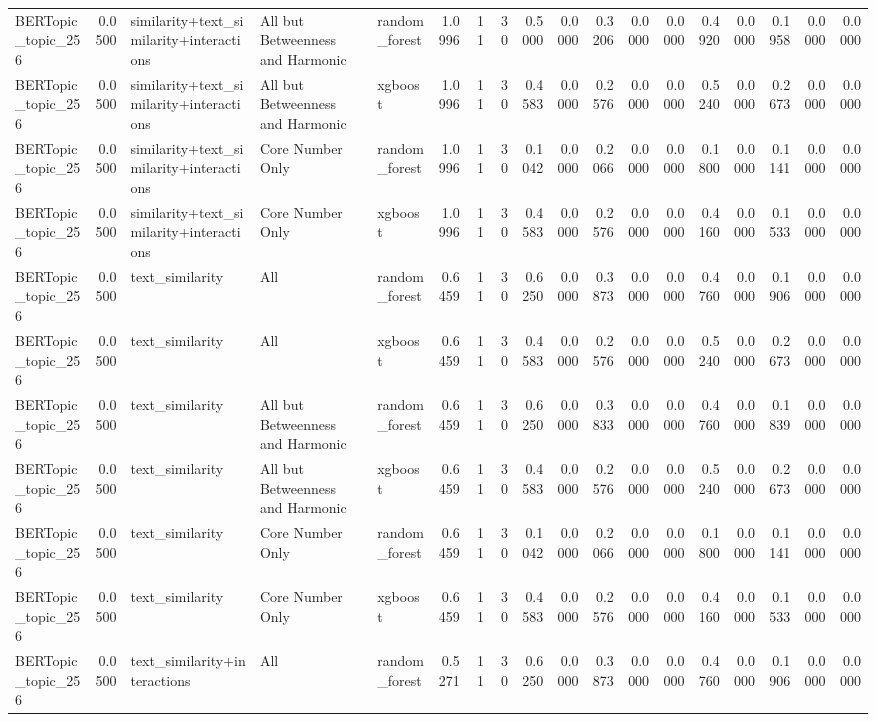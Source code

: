 \begin{tabular}{lrlllrrrrrrrrrrrrr}
BERTopic_topic_256 & 0.0500 & similarity+text_similarity+interactions & All but Betweenness and Harmonic & random_forest & 1.0996 & 11 & 30 & 0.5000 & 0.0000 & 0.3206 & 0.0000 & 0.0000 & 0.4920 & 0.0000 & 0.1958 & 0.0000 & 0.0000 \\
BERTopic_topic_256 & 0.0500 & similarity+text_similarity+interactions & All but Betweenness and Harmonic & xgboost & 1.0996 & 11 & 30 & 0.4583 & 0.0000 & 0.2576 & 0.0000 & 0.0000 & 0.5240 & 0.0000 & 0.2673 & 0.0000 & 0.0000 \\
BERTopic_topic_256 & 0.0500 & similarity+text_similarity+interactions & Core Number Only & random_forest & 1.0996 & 11 & 30 & 0.1042 & 0.0000 & 0.2066 & 0.0000 & 0.0000 & 0.1800 & 0.0000 & 0.1141 & 0.0000 & 0.0000 \\
BERTopic_topic_256 & 0.0500 & similarity+text_similarity+interactions & Core Number Only & xgboost & 1.0996 & 11 & 30 & 0.4583 & 0.0000 & 0.2576 & 0.0000 & 0.0000 & 0.4160 & 0.0000 & 0.1533 & 0.0000 & 0.0000 \\
BERTopic_topic_256 & 0.0500 & text_similarity & All & random_forest & 0.6459 & 11 & 30 & 0.6250 & 0.0000 & 0.3873 & 0.0000 & 0.0000 & 0.4760 & 0.0000 & 0.1906 & 0.0000 & 0.0000 \\
BERTopic_topic_256 & 0.0500 & text_similarity & All & xgboost & 0.6459 & 11 & 30 & 0.4583 & 0.0000 & 0.2576 & 0.0000 & 0.0000 & 0.5240 & 0.0000 & 0.2673 & 0.0000 & 0.0000 \\
BERTopic_topic_256 & 0.0500 & text_similarity & All but Betweenness and Harmonic & random_forest & 0.6459 & 11 & 30 & 0.6250 & 0.0000 & 0.3833 & 0.0000 & 0.0000 & 0.4760 & 0.0000 & 0.1839 & 0.0000 & 0.0000 \\
BERTopic_topic_256 & 0.0500 & text_similarity & All but Betweenness and Harmonic & xgboost & 0.6459 & 11 & 30 & 0.4583 & 0.0000 & 0.2576 & 0.0000 & 0.0000 & 0.5240 & 0.0000 & 0.2673 & 0.0000 & 0.0000 \\
BERTopic_topic_256 & 0.0500 & text_similarity & Core Number Only & random_forest & 0.6459 & 11 & 30 & 0.1042 & 0.0000 & 0.2066 & 0.0000 & 0.0000 & 0.1800 & 0.0000 & 0.1141 & 0.0000 & 0.0000 \\
BERTopic_topic_256 & 0.0500 & text_similarity & Core Number Only & xgboost & 0.6459 & 11 & 30 & 0.4583 & 0.0000 & 0.2576 & 0.0000 & 0.0000 & 0.4160 & 0.0000 & 0.1533 & 0.0000 & 0.0000 \\
BERTopic_topic_256 & 0.0500 & text_similarity+interactions & All & random_forest & 0.5271 & 11 & 30 & 0.6250 & 0.0000 & 0.3873 & 0.0000 & 0.0000 & 0.4760 & 0.0000 & 0.1906 & 0.0000 & 0.0000 \\

\end{tabular}
